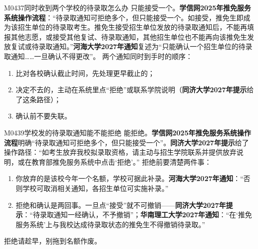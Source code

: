 \begin{qa}{M0437}{同时收到两个学校的待录取怎么办}
只能接受一个。\textbf{学信网2025年推免服务系统操作流程}：“待录取通知可拒绝多个，但只能接受一个。如接受，推免生即成为该招生单位的待录取考生。推免生接受招生单位发放的待录取通知后，不能再填报其他志愿，或接受其他复试、待录取通知，其他招生单位也不能再向该推免生发放复试或待录取通知。”\textbf{河海大学2027年通知}复述为“只能确认一个招生单位的待录取通知……一旦确认不得更改”。
两个通知同时到手时的顺序：
\begin{enumerate}
  \item 比对各校确认截止时间，先处理更早截止的；
  \item 决定不去的，主动在系统里点“拒绝”或联系学院说明（\textbf{同济大学2027年提示}给了这条路径）；
  \item 确认前不要失联。
\end{enumerate}
\end{qa}

\begin{qa}{M0439}{学校发的待录取通知能不能拒绝}
能拒绝。\textbf{学信网2025年推免服务系统操作流程}明确“待录取通知可拒绝多个，但只能接受一个”。\textbf{同济大学2027年提示}给了操作路径：“如考生放弃我校拟录取资格，请主动与招生学院联系并提供放弃说明，或在教育部推免服务系统中点击‘拒绝’。”
拒绝前要清楚两件事：
\begin{enumerate}
  \item 你放弃的是该校今年一个名额，学校可据此补录。\textbf{河海大学2027年通知}：“否则学校可取消相关通知，各招生单位可实施补录。”
  \item 拒绝和确认是两回事。一旦点“接受”就不可撤销——\textbf{同济大学2027年提示}：“待录取通知一经确认，不予撤销”；\textbf{华南理工大学2027年通知}：“在‘推免服务系统’上与我校达成待录取状态的推免生不得撤销待录取。”
\end{enumerate}
拒绝请趁早，别拖到名额作废。
\end{qa}

